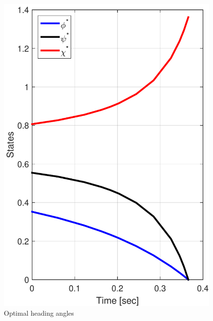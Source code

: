 \documentclass{beamer}
\begin{document}
\begin{frame}
\begin{columns}[c]
	\begin{column}{.3\linewidth}
		\begin{figure}[H]
			\centering
			\includegraphics[scale = 0.2]{fig/fig7b_paper.pdf}
			\caption{Optimal heading angles}
		\end{figure}
		
	\end{column}
	

\end{columns}
\end{frame}
\end{document}
